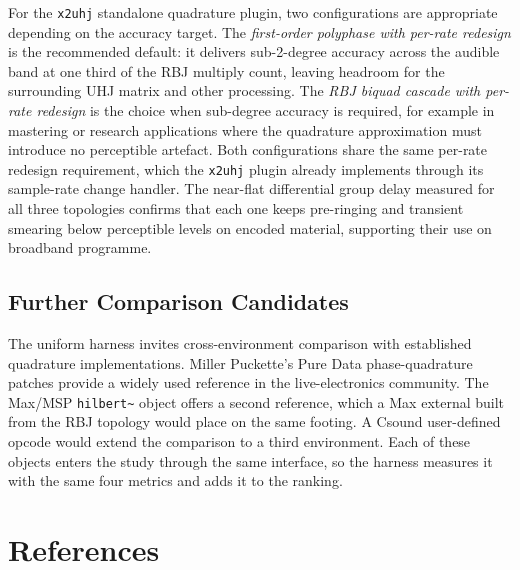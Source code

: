 \documentclass[11pt,a4paper]{article}
\begin{document}
For the \texttt{x2uhj} standalone quadrature plugin, two configurations are
appropriate depending on the accuracy target.
The \emph{first-order polyphase with per-rate redesign} is the recommended
default: it delivers sub-2-degree accuracy across the audible band at one
third of the RBJ multiply count, leaving headroom for the surrounding UHJ
matrix and other processing.
The \emph{RBJ biquad cascade with per-rate redesign} is the choice when
sub-degree accuracy is required, for example in mastering or research
applications where the quadrature approximation must introduce no perceptible
artefact.
Both configurations share the same per-rate redesign requirement, which the
\texttt{x2uhj} plugin already implements through its sample-rate change
handler.
The near-flat differential group delay measured for all three topologies
confirms that each one keeps pre-ringing and transient smearing below
perceptible levels on encoded material, supporting their use on broadband
programme.

\subsection{Further Comparison Candidates}

The uniform harness invites cross-environment comparison with established
quadrature implementations.
Miller Puckette's Pure Data phase-quadrature patches provide a widely used
reference in the live-electronics community.
The Max/MSP \texttt{hilbert\textasciitilde} object offers a second reference,
which a Max external built from the RBJ topology would place on the same
footing.
A Csound user-defined opcode would extend the comparison to a third
environment.
Each of these objects enters the study through the same interface, so the
harness measures it with the same four metrics and adds it to the ranking.

\section*{References}



\end{document}
